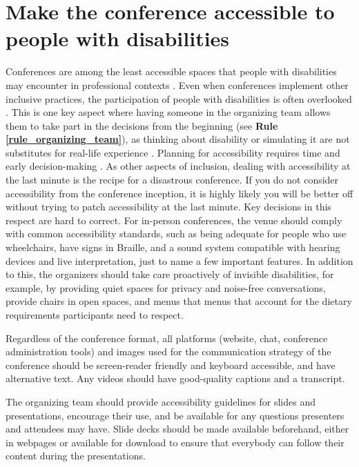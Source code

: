 \documentclass[10pt,letterpaper]{article}
\begin{document}
\section{Make the conference accessible to people with disabilities}
\label{rule_accessibility}


Conferences are among the least accessible spaces that people with disabilities may encounter in professional contexts \cite{priceAccessImaginedConstruction2009}. Even when conferences implement other inclusive practices, the participation of people with disabilities is often overlooked \cite{marks2021meeting}. This is one key aspect where having someone in the organizing team allows them to take part in the decisions from the beginning (see \textbf{Rule \ref{rule_organizing_team}}), as thinking about disability or simulating it are not substitutes for real-life experience \cite{costanzachockDesign2020}. Planning for accessibility requires time and early decision-making \cite{irishIncreasingParticipationUsing2020}. As other aspects of inclusion, dealing with accessibility at the last minute is the recipe for a disastrous conference. If you do not consider accessibility from the conference inception, it is highly likely you will be better off without trying to patch accessibility at the last minute. Key decisions in this respect are hard to correct. 
For in-person conferences, the venue should comply with common accessibility standards, such as being adequate for people who use wheelchairs, have signs in Braille, and a sound system compatible with hearing devices and live interpretation, just to name a few important features. In addition to this, the organizers should take care proactively of invisible disabilities, for example, by providing quiet spaces for privacy and noise-free conversations, provide chairs in open spaces, and menus that menus that account for the dietary requirements participants need to respect.

Regardless of the conference format, all platforms (website, chat, conference administration tools) and images used for the communication strategy of the conference should be screen-reader friendly and keyboard accessible, and have alternative text. Any videos should have good-quality captions and a transcript.

The organizing team should provide accessibility guidelines for slides and presentations, encourage their use, and be available for any questions presenters and attendees may have. Slide decks should be made available beforehand, either in webpages or available for download to ensure that everybody can follow their content during the presentations. 
\end{document}
